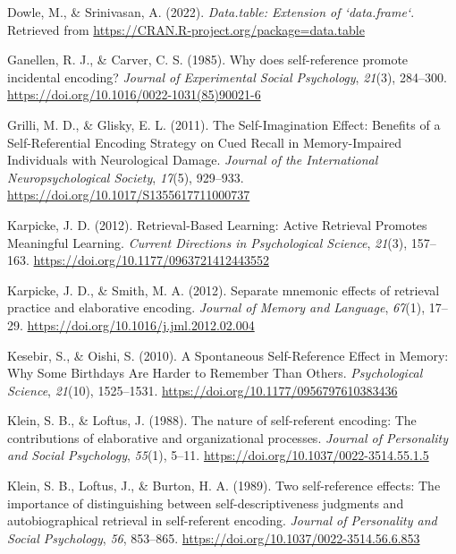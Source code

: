 \documentclass[
  man,floatsintext]{apa6}
\newlength{\cslhangindent}
\newlength{\cslentryspacingunit} %
\newenvironment{CSLReferences}[2] %
 {%
  \setlength{\parindent}{0pt}
  \ifodd #1
  \let\oldpar\par
  \def\par{\hangindent=\cslhangindent\oldpar}
  \fi
  \setlength{\parskip}{#2\cslentryspacingunit}
 }%
 {}
\begin{document}
\begin{CSLReferences}{1}{0}
\leavevmode{}%
Dowle, M., \& Srinivasan, A. (2022). \emph{Data.table: Extension of `data.frame`}. Retrieved from \url{https://CRAN.R-project.org/package=data.table}

\leavevmode{}%
Ganellen, R. J., \& Carver, C. S. (1985). Why does self-reference promote incidental encoding? \emph{Journal of Experimental Social Psychology}, \emph{21}(3), 284--300. \url{https://doi.org/10.1016/0022-1031(85)90021-6}

\leavevmode{}%
Grilli, M. D., \& Glisky, E. L. (2011). The {Self}-{Imagination} {Effect}: {Benefits} of a {Self}-{Referential} {Encoding} {Strategy} on {Cued} {Recall} in {Memory}-{Impaired} {Individuals} with {Neurological} {Damage}. \emph{Journal of the International Neuropsychological Society}, \emph{17}(5), 929--933. \url{https://doi.org/10.1017/S1355617711000737}

\leavevmode{}%
Karpicke, J. D. (2012). Retrieval-{Based} {Learning}: {Active} {Retrieval} {Promotes} {Meaningful} {Learning}. \emph{Current Directions in Psychological Science}, \emph{21}(3), 157--163. \url{https://doi.org/10.1177/0963721412443552}

\leavevmode{}%
Karpicke, J. D., \& Smith, M. A. (2012). Separate mnemonic effects of retrieval practice and elaborative encoding. \emph{Journal of Memory and Language}, \emph{67}(1), 17--29. \url{https://doi.org/10.1016/j.jml.2012.02.004}

\leavevmode{}%
Kesebir, S., \& Oishi, S. (2010). A {Spontaneous} {Self}-{Reference} {Effect} in {Memory}: {Why} {Some} {Birthdays} {Are} {Harder} to {Remember} {Than} {Others}. \emph{Psychological Science}, \emph{21}(10), 1525--1531. \url{https://doi.org/10.1177/0956797610383436}

\leavevmode{}%
Klein, S. B., \& Loftus, J. (1988). The nature of self-referent encoding: {The} contributions of elaborative and organizational processes. \emph{Journal of Personality and Social Psychology}, \emph{55}(1), 5--11. \url{https://doi.org/10.1037/0022-3514.55.1.5}

\leavevmode{}%
Klein, S. B., Loftus, J., \& Burton, H. A. (1989). Two self-reference effects: {The} importance of distinguishing between self-descriptiveness judgments and autobiographical retrieval in self-referent encoding. \emph{Journal of Personality and Social Psychology}, \emph{56}, 853--865. \url{https://doi.org/10.1037/0022-3514.56.6.853}


\end{CSLReferences}
\end{document}
